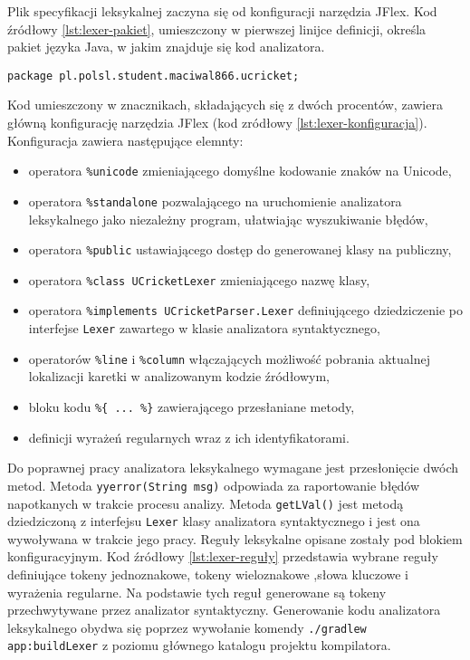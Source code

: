 Plik specyfikacji leksykalnej zaczyna się od konfiguracji narzędzia JFlex. Kod źródłowy \ref{lst:lexer-pakiet}, umieszczony w pierwszej linijce definicji, określa pakiet języka Java, w jakim znajduje się kod analizatora.
\begin{lstlisting}[caption={Definicja pakietu dla analizatora leksykalnego}, label={lst:lexer-pakiet}]
package pl.polsl.student.maciwal866.ucricket;
\end{lstlisting}
Kod umieszczony w znacznikach, składających się z dwóch procentów, zawiera główną konfigurację narzędzia JFlex (kod zródłowy \ref{lst:lexer-konfiguracja}). Konfiguracja zawiera następujące elemnty:
\begin{itemize}
\item operatora \lstinline|%unicode| zmieniającego domyślne kodowanie znaków na Unicode,
\item operatora \lstinline|%standalone| pozwalającego na uruchomienie analizatora leksykalnego jako niezależny program, ułatwiając wyszukiwanie błędów,
\item operatora \lstinline|%public| ustawiającego dostęp do generowanej klasy na publiczny,
\item operatora \lstinline|%class UCricketLexer| zmieniającego nazwę klasy,
\item operatora \lstinline|%implements UCricketParser.Lexer| definiującego dziedziczenie po interfejse \lstinline|Lexer| zawartego w klasie analizatora syntaktycznego,
\item operatorów \lstinline|%line| i \lstinline|%column| włączających możliwość pobrania aktualnej lokalizacji karetki w analizowanym kodzie źródłowym,
\item bloku kodu \lstinline|%{ ... %}| zawierającego przesłaniane metody,
\item definicji wyrażeń regularnych wraz z ich identyfikatorami.
\end{itemize}
Do poprawnej pracy analizatora leksykalnego wymagane jest przesłonięcie dwóch metod. Metoda \lstinline|yyerror(String msg)| odpowiada za raportowanie błędów napotkanych w trakcie procesu analizy. Metoda \lstinline|getLVal()| jest metodą dziedziczoną z interfejsu \lstinline|Lexer| klasy analizatora syntaktycznego i jest ona wywoływana w trakcie jego pracy.
Reguły leksykalne opisane zostały pod blokiem konfiguracyjnym. Kod źródłowy \ref{lst:lexer-reguły} przedstawia wybrane reguły definiujące tokeny jednoznakowe, tokeny wieloznakowe ,słowa kluczowe i wyrażenia regularne. Na podstawie tych reguł generowane są tokeny przechwytywane przez analizator syntaktyczny.
Generowanie kodu analizatora leksykalnego obydwa się poprzez wywołanie komendy \lstinline|./gradlew app:buildLexer| z poziomu głównego katalogu projektu kompilatora.

